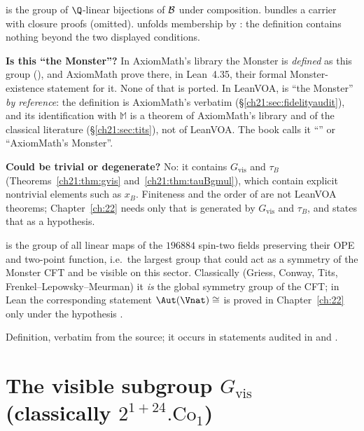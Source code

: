 \begin{dictionary}
 is the group of $\Q$-linear bijections of $\mathcal{B}$ under composition.
 bundles a carrier with closure proofs (omitted).   unfolds membership by
: the definition contains nothing beyond the two displayed conditions.

\textbf{Is this ``the Monster''?}  In AxiomMath's library the Monster is \emph{defined} as this group
(), and AxiomMath prove there, in Lean~4.35, their formal
Monster-existence statement for it.  None of that is ported.  In LeanVOA,  is ``the
Monster'' \emph{by reference}: the definition is AxiomMath's verbatim (\S\ref{ch21:sec:fidelityaudit}),
and its identification with $\mathbb M$ is a theorem of AxiomMath's library and of the classical
literature (\S\ref{ch21:sec:tits}), not of LeanVOA.  The book calls it ``'' or ``AxiomMath's
Monster''.

\textbf{Could  be trivial or degenerate?}  No: it contains $G_{\mathrm{vis}}$ and $\tau_B$
(Theorems~\ref{ch21:thm:gvis} and~\ref{ch21:thm:tauBgmul}), which contain explicit nontrivial elements such
as $x_B$.  Finiteness and the order of  are not LeanVOA theorems; Chapter~\ref{ch:22} needs only
that  is generated by $G_{\mathrm{vis}}$ and $\tau_B$, and states that as a hypothesis.
\end{dictionary}
\begin{physics}
 is the group of all linear maps of the $196884$ spin-two fields preserving their OPE and
two-point function, i.e.\ the largest group that could act as a symmetry of the Monster CFT and be visible
on this sector.  Classically (Griess, Conway, Tits, Frenkel--Lepowsky--Meurman) it \emph{is} the global
symmetry group of the CFT; in Lean the corresponding statement $\Aut(\Vnat)\cong$  is proved in
Chapter~\ref{ch:22} only under the hypothesis .
\end{physics}
\begin{status}
Definition, verbatim from the source; it occurs in statements audited in
 and .
\end{status}

\section{The visible subgroup \texorpdfstring{$G_{\mathrm{vis}}$}{Gvis} (classically \texorpdfstring{$2^{1+24}.\mathrm{Co}_1$}{2\^{}(1+24).Co1})}\label{ch21:sec:gvis}

